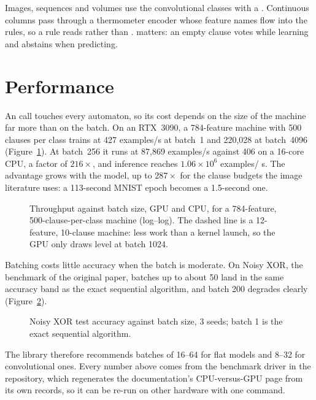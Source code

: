\documentclass[10.5pt,a4paper]{article}
\begin{document}
Images, sequences and volumes use the convolutional classes with a .
Continuous columns pass through a thermometer encoder whose feature names flow into the
rules, so a rule reads  rather than .
 matters: an empty clause votes while learning and abstains when
predicting.

\section{Performance}

An  call touches every automaton, so its cost depends on the size of the
machine far more than on the batch. On an RTX~3090, a 784-feature machine with 500 clauses per
class trains at 427 examples\slash s at batch~1 and 220{,}028 at batch~4096
(Figure~\ref{fig:s-bench}). At batch~256 it runs at 87{,}869 examples\slash s against 406 on a
16-core CPU, a factor of $216\times$, and inference reaches $1.06\times10^{6}$ examples\slash
s. The advantage grows with the model, up to $287\times$ for the clause budgets the
image literature uses: a 113-second MNIST epoch becomes a 1.5-second one.

\begin{figure}[htbp]
\centering

\caption{Throughput against batch size, GPU and CPU, for a 784-feature, 500-clause-per-class
  machine (log--log). The dashed line is a 12-feature, 10-clause machine: less work than a
  kernel launch, so the GPU only draws level at batch 1024.}
\label{fig:s-bench}
\end{figure}

Batching costs little accuracy when the batch is moderate. On Noisy XOR, the benchmark of the
original paper, batches up to about 50 land in the same accuracy band as the exact sequential
algorithm, and batch 200 degrades clearly (Figure~\ref{fig:s-fidelity}).

\begin{figure}[htbp]
\centering

\caption{Noisy XOR test accuracy against batch size, 3 seeds; batch 1 is the exact sequential
  algorithm.}
\label{fig:s-fidelity}
\end{figure}

\noindent The library therefore recommends batches of 16--64
for flat models and 8--32 for convolutional ones. Every number above comes from the benchmark
driver in the repository, which regenerates the documentation's CPU-versus-GPU page from its
own records, so it can be re-run on other hardware with one command.
\end{document}
